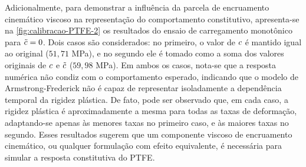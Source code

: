 \documentclass[Tese.tex]{subfiles}
\begin{document}
{Adicionalmente, para demonstrar a influência da parcela de encruamento cinemático viscoso na representação do comportamento constitutivo, apresenta-se na \autoref{fig:calibracao-PTFE-2} os resultados do ensaio de carregamento monotônico para $\tilde{c}=0$. Dois casos são considerados: no primeiro, o valor de $c$ é mantido igual ao original ($51,71$ MPa), e no segundo ele é tomado como a soma dos valores originais de $c$ e $\tilde{c}$ ($59,98$ MPa). Em ambos os casos, nota-se que a resposta numérica não condiz com o comportamento esperado, indicando que o modelo de Armstrong-Frederick não é capaz de representar isoladamente a dependência temporal da rigidez plástica. De fato, pode ser observado que, em cada caso, a rigidez plástica é aproximadamente a mesma para todas as taxas de deformação, adaptando-se apenas às menores taxas no primeiro caso, e às maiores taxas no segundo. Esses resultados sugerem que um componente viscoso de encruamento cinemático, ou qualquer formulação com efeito equivalente, é necessária para simular a resposta constitutiva do PTFE.

}
\end{document}
